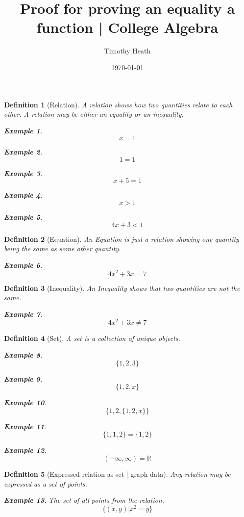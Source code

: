 \documentclass{amsart}
\title{Proof for proving an equality a function | College Algebra}
\author{Timothy Heath}
\date{\today}
\newtheorem{exa}{Example}
\newtheorem{defn}{Definition}
\begin{document}
	\maketitle
	\newpage
	\begin{defn}[Relation]
		A relation shows how two quantities
		relate to each other. A relation may
		be either an equality or an inequality.
		\begin{exa}
			$$x=1$$
		\end{exa}
		\begin{exa}
			$$1=1$$
		\end{exa}
		\begin{exa}
			$$x+5=1$$
		\end{exa}
		\begin{exa}
			$$x>1$$
		\end{exa}
		\begin{exa}
			$$4x+3<1$$
		\end{exa}
	\end{defn}
	\begin{defn}[Equation]
		An Equation is just a relation showing
		one quantity being the same as some
		other quantity.
		\begin{exa}
			$$4x^2+3x=7$$
		\end{exa}
	\end{defn}
	\begin{defn}[Inequality]
		An Inequality shows that two quantities are not the
		same.
		\begin{exa}
			$$4x^2+3x\neq7$$
		\end{exa}
	\end{defn}
	\begin{defn}[Set]
		A set is a collection of unique objects.
		\begin{exa}
			$$\{1,2,3\}$$
		\end{exa}
		\begin{exa}
			$$\{1,2,x\}$$
		\end{exa}
		\begin{exa}
			$$\{1,2,\{1,2,x\}\}$$
		\end{exa}
		\begin{exa}
			$$\{1,1,2\}=\{1,2\}$$
		\end{exa}
		\begin{exa}
			$$(-\infty,\infty)=\mathbb{R}$$
		\end{exa}
	\end{defn}
	\begin{defn}[Expressed relation as set | graph data]
		Any relation may be expressed as a set of points.
		\begin{exa}
			The set of all points from the relation.
			$$\{(x,y)|x^2=y\}$$
		\end{exa}
	\end{defn}
\end{document}

